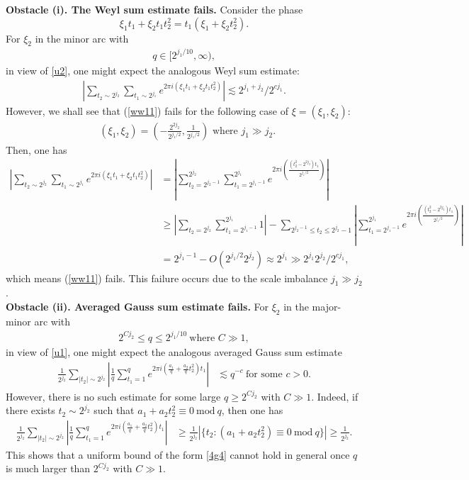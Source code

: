 \documentclass[10pt,a4paper]{amsart}
\numberwithin{equation}{section}
\begin{document}
 

\noindent\textbf{Obstacle (i). The Weyl sum estimate fails.}
Consider the phase
$$\xi_{1} t_1+\xi_{2} t_1t_2^2=t_1(\xi_{1}+\xi_{2}t_2^2).$$
For $\xi_2$ in the minor arc  with  \begin{align}\label{w1}
	q \in [2^{j_1/10},\infty), 
\end{align}in view of \eqref{u2}, one might expect the analogous Weyl sum estimate:
\begin{align}\label{ww11}
	\left|\sum_{t_2\sim 2^{j_2}}\sum_{t_1\sim 2^{j_1}} e^{2\pi  i\left(\xi_{1}t_1+\xi_{2}t_1t_2^2\right)}\right|\lesssim 2^{j_1+j_2}/2^{c j_1}.
\end{align}
However, we shall see that (\ref{ww11}) fails for the following case of $\xi=(\xi_1,\xi_2)$:
\begin{align*} 
	\text{ $(\xi_{1},\xi_2)=(-\frac{2^{2j_2}}{2^{j_1/2}},\frac{1}{2^{j_1/2}}) $ where  }  j_1\gg j_2.
\end{align*}
 Then, one has
\begin{align*}
	\left|\sum_{t_2\sim 2^{j_2}}\sum_{t_1\sim 2^{j_1}} e^{2\pi  i\left(\xi_{1}t_1+\xi_{2}t_1t_2^2\right)}\right|
	&=\left|\sum_{t_2=2^{j_2-1}}^{2^{j_2}}\sum_{t_1=2^{j_1-1}}^{2^{j_1}} e^{2\pi  i\left(\frac{(t_2^2-2^{2j_2})t_1}{2^{j_1/2}}\right)}\right|\\
	&\ge \left|\sum_{t_2=2^{j_2}} \sum_{t_1=2^{j_1-1}}^{2^{j_1}} 1\right|-\sum_{2^{j_2-1}\le t_2\le 2^{j_2}-1}\left|\sum_{t_1=2^{j_1-1}}^{2^{j_1}}  
	e^{2\pi  i\left(\frac{(t_2^2-2^{2j_2})t_1}{2^{j_1/2}}\right)}\right|\\
	&= 2^{j_1-1}-O(2^{j_1/2}2^{j_2})\approx 2^{j_1}\gg 2^{j_1} 2^{j_2}/2^{c j_1},
\end{align*}
which means (\ref{ww11}) fails. This failure  occurs due to the scale imbalance   $j_1\gg j_2$.\\


\noindent\textbf{Obstacle (ii). Averaged Gauss sum estimate  fails.} For $\xi_2$ in the major-minor arc  
 with \begin{align}\label{w2}
 	2^{Cj_2}\le q\le 2^{j_1/10}  \ \text{where $C\gg 1$},
 \end{align}  in view of \eqref{u1}, one might expect the analogous averaged Gauss sum estimate 
 \begin{align}\label{4g4}
 \frac{1}{2^{j_2}} \sum_{|t_2|\sim 2^{j_2}}\left|\frac{1}{q}\sum_{t_1=1}^q e^{2\pi i  (\frac{a_1}{q}+\frac{a_2}{q}t_2^2) t_1}\right| & \lesssim  q^{-c}\ \text{for some $c>0$}.
 \end{align}
However, there is  no    such estimate for some large $q\ge 2^{Cj_2}$  with $C\gg 1$. Indeed, if there exists   $t_2\sim 2^{j_2}$ such that   $a_1+a_2t_2^2\equiv 0\ \text{mod} \ q$, then one has
\begin{align*}
	\frac{1}{2^{j_2}} \sum_{|t_2|\sim 2^{j_2}}\left|\frac{1}{q}\sum_{t_1=1}^q e^{2\pi i  (\frac{a_1}{q}+\frac{a_2}{q}t_2^2) t_1}\right| &\ge \frac{1}{2^{j_2}}\left|\{t_2:  (a_1+a_2t_2^2)\equiv 0\  \text{mod}\ q\}\right| \ge\frac{1}{2^{j_2}}.
\end{align*}
This shows that a uniform bound of the form \eqref{4g4} cannot hold in general once $q$ is much larger than $2^{Cj_2}$ with $C\gg 1$.
\end{document}
